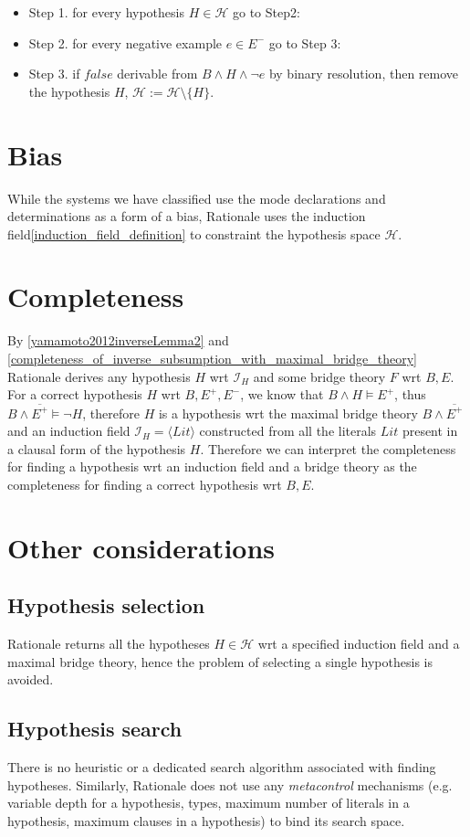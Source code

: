 \begin{itemize}
\item Step 1. for every hypothesis $H \in \mathcal{H}$ go to Step2:
\item Step 2. for every negative example $e \in E^-$ go to Step 3:
\item Step 3. if $false$ derivable from $B \land H \land \neg e$ by binary resolution, then remove the hypothesis $H$, $\mathcal{H}:=\mathcal{H} \setminus \{H\}$.
\end{itemize}

\section{Bias}
While the systems we have classified use the mode declarations and determinations as a form of a bias, Rationale uses the induction field\ref{induction_field_definition} to constraint the hypothesis space $\mathcal{H}$.

\section{Completeness}
By \ref{yamamoto2012inverseLemma2} and \ref{completeness_of_inverse_subsumption_with_maximal_bridge_theory} Rationale derives any hypothesis $H$ wrt $\mathcal{I}_H$ and some bridge theory $F$ wrt $B, E$. For a correct hypothesis $H$ wrt $B, E^+, E^-$, we know that $B \land H \models E^+$, thus $B \land \overline{E^+} \models \neg H$, therefore $H$ is a hypothesis wrt the maximal bridge theory $B \land \overline{E^+}$ and an induction field $\mathcal{I}_H=\langle Lit \rangle$ constructed from all the literals $Lit$ present in a clausal form of the hypothesis $H$. Therefore we can interpret the completeness for finding a hypothesis wrt an induction field and a bridge theory as the completeness for finding a correct hypothesis wrt $B, E$.

\section{Other considerations}
\subsection{Hypothesis selection}
Rationale returns all the hypotheses $H \in \mathcal{H}$ wrt a specified induction field and a maximal bridge theory, hence the problem of selecting a single hypothesis is avoided.

\subsection{Hypothesis search}\label{subsec:rationale_hypothesis_search}
There is no heuristic or a dedicated search algorithm associated with finding hypotheses. Similarly, Rationale does not use any \emph{metacontrol} mechanisms (e.g. variable depth for a hypothesis, types, maximum number of literals in a hypothesis, maximum clauses in a hypothesis) to bind its search space.

